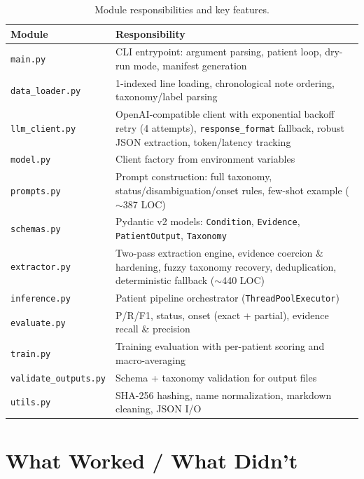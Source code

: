 \documentclass[11pt, a4paper]{article}
\begin{document}
\begin{table}[H]
\centering
\caption{Module responsibilities and key features.}
\small
\begin{tabularx}{\textwidth}{lX}
\toprule
\textbf{Module} & \textbf{Responsibility} \\
\midrule
\texttt{main.py} & CLI entrypoint: argument parsing, patient loop, dry-run mode, manifest generation \\
\texttt{data\_loader.py} & 1-indexed line loading, chronological note ordering, taxonomy/label parsing \\
\texttt{llm\_client.py} & OpenAI-compatible client with exponential backoff retry (4 attempts), \texttt{response\_format} fallback, robust JSON extraction, token/latency tracking \\
\texttt{model.py} & Client factory from environment variables \\
\texttt{prompts.py} & Prompt construction: full taxonomy, status/disambiguation/onset rules, few-shot example ($\sim$387 LOC) \\
\texttt{schemas.py} & Pydantic v2 models: \texttt{Condition}, \texttt{Evidence}, \texttt{PatientOutput}, \texttt{Taxonomy} \\
\texttt{extractor.py} & Two-pass extraction engine, evidence coercion \& hardening, fuzzy taxonomy recovery, deduplication, deterministic fallback ($\sim$440 LOC) \\
\texttt{inference.py} & Patient pipeline orchestrator (\texttt{ThreadPoolExecutor}) \\
\texttt{evaluate.py} & P/R/F1, status, onset (exact + partial), evidence recall \& precision \\
\texttt{train.py} & Training evaluation with per-patient scoring and macro-averaging \\
\texttt{validate\_outputs.py} & Schema + taxonomy validation for output files \\
\texttt{utils.py} & SHA-256 hashing, name normalization, markdown cleaning, JSON I/O \\
\bottomrule
\end{tabularx}
\end{table}

\section{What Worked / What Didn't}
\end{document}
